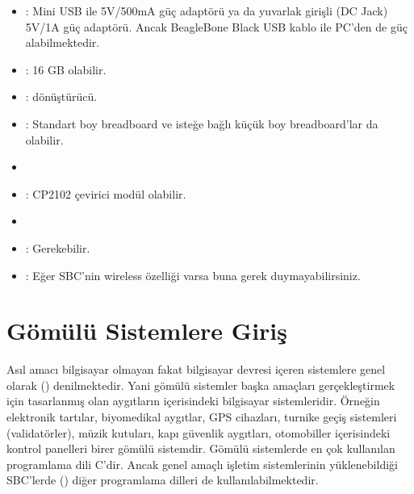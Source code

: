\documentclass[letterpaper,10pt,turkish]{sphinxmanual}
\begin{document}
\begin{itemize}
\item {} 
\sphinxAtStartPar
{}: Mini USB ile 5V/500mA güç adaptörü ya da yuvarlak girişli (DC Jack)
5V/1A güç adaptörü. Ancak BeagleBone Black USB kablo ile PC’den de güç alabilmektedir.

\item {} 
\sphinxAtStartPar
{}: 16 GB olabilir.

\item {} 
\sphinxAtStartPar
{}:  dönüştürücü.

\item {} 
\sphinxAtStartPar
{}: Standart boy breadboard ve isteğe bağlı küçük boy breadboard’lar da olabilir.

\item {} 
\sphinxAtStartPar
{}

\item {} 
\sphinxAtStartPar
{}: CP2102 çevirici modül olabilir.

\item {} 
\sphinxAtStartPar
{}

\item {} 
\sphinxAtStartPar
{}: Gerekebilir.

\item {} 
\sphinxAtStartPar
{}: Eğer SBC’nin wireless özelliği varsa buna gerek duymayabilirsiniz.

\end{itemize}


\section{Gömülü Sistemlere Giriş}
\label{\detokenize{introduction:gomulu-sistemlere-giris}}
\sphinxAtStartPar
Asıl amacı bilgisayar olmayan fakat bilgisayar devresi içeren sistemlere genel olarak
 () denilmektedir. Yani gömülü sistemler başka amaçları
gerçekleştirmek için tasarlanmış olan aygıtların içerisindeki bilgisayar sistemleridir. Örneğin
elektronik tartılar, biyomedikal aygıtlar, GPS cihazları, turnike geçiş sistemleri (validatörler),
müzik kutuları, kapı güvenlik aygıtları, otomobiller içerisindeki kontrol panelleri birer gömülü
sistemdir. Gömülü sistemlerde en çok kullanılan programlama dili C’dir. Ancak genel amaçlı
işletim sistemlerinin yüklenebildiği SBC’lerde () diğer programlama dilleri
de kullanılabilmektedir.
\end{document}
